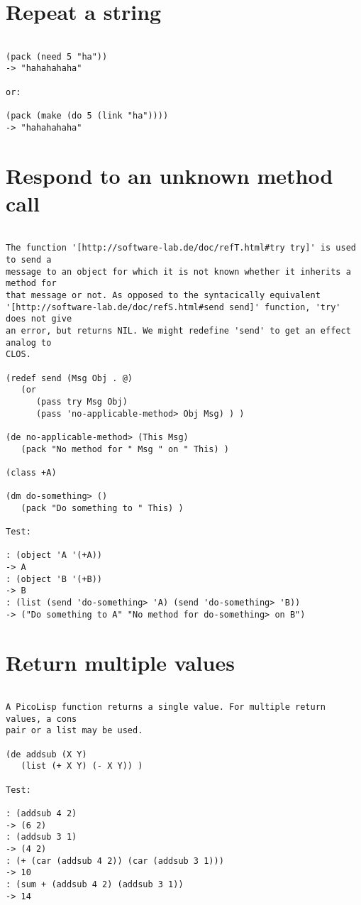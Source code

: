 \section*{Repeat a string}

\begin{verbatim}

(pack (need 5 "ha"))
-> "hahahahaha"

or:

(pack (make (do 5 (link "ha"))))
-> "hahahahaha"

\end{verbatim}

\section*{Respond to an unknown method call}

\begin{verbatim}

The function '[http://software-lab.de/doc/refT.html#try try]' is used to send a
message to an object for which it is not known whether it inherits a method for
that message or not. As opposed to the syntacically equivalent
'[http://software-lab.de/doc/refS.html#send send]' function, 'try' does not give
an error, but returns NIL. We might redefine 'send' to get an effect analog to
CLOS.

(redef send (Msg Obj . @)
   (or
      (pass try Msg Obj)
      (pass 'no-applicable-method> Obj Msg) ) )

(de no-applicable-method> (This Msg)
   (pack "No method for " Msg " on " This) )

(class +A)

(dm do-something> ()
   (pack "Do something to " This) )

Test:

: (object 'A '(+A))
-> A
: (object 'B '(+B))
-> B
: (list (send 'do-something> 'A) (send 'do-something> 'B))
-> ("Do something to A" "No method for do-something> on B")

\end{verbatim}

\section*{Return multiple values}

\begin{verbatim}

A PicoLisp function returns a single value. For multiple return values, a cons
pair or a list may be used.

(de addsub (X Y)
   (list (+ X Y) (- X Y)) )

Test:

: (addsub 4 2)
-> (6 2)
: (addsub 3 1)
-> (4 2)
: (+ (car (addsub 4 2)) (car (addsub 3 1)))
-> 10
: (sum + (addsub 4 2) (addsub 3 1))
-> 14

\end{verbatim}

